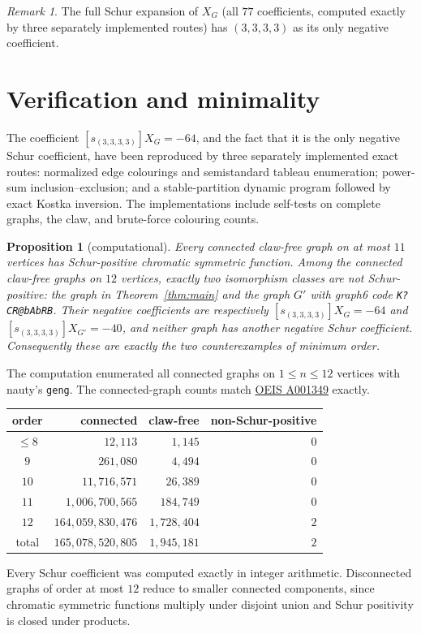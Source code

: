 \documentclass[11pt]{article}
\newtheorem{proposition}[theorem]{Proposition}
\theoremstyle{remark}
\newtheorem{remark}[theorem]{Remark}
\newcommand{\csf}{X}
\begin{document}
\begin{remark}
The full Schur expansion of $\csf_G$ (all $77$ coefficients, computed
exactly by three separately implemented routes) has $(3,3,3,3)$ as its only
negative coefficient.
\end{remark}

\section{Verification and minimality}

The coefficient $[s_{(3,3,3,3)}]\csf_G = -64$, and the fact that it is the
only negative Schur coefficient, have been reproduced by three separately
implemented exact routes: normalized edge colourings and semistandard
tableau enumeration; power-sum inclusion--exclusion; and a stable-partition
dynamic program followed by exact Kostka inversion. The implementations
include self-tests on complete graphs, the claw, and brute-force colouring
counts.

\begin{proposition}[computational]\label{prop:minimal}
Every connected claw-free graph on at most $11$ vertices has Schur-positive
chromatic symmetric function. Among the connected claw-free graphs on $12$
vertices, exactly two isomorphism classes are not Schur-positive: the graph
in Theorem~\ref{thm:main} and the graph $G'$ with graph6 code
\texttt{K?\textasciigrave CR@\textasciigrave bAbRB}. Their negative
coefficients are respectively
$[s_{(3,3,3,3)}]\csf_G=-64$ and
$[s_{(3,3,3,3)}]\csf_{G'}=-40$, and neither graph has another negative
Schur coefficient. Consequently these are exactly the two counterexamples
of minimum order.
\end{proposition}

The computation enumerated all connected graphs on $1 \le n \le 12$
vertices with \textsf{nauty}'s \texttt{geng}. The connected-graph counts
match \href{https://oeis.org/A001349}{OEIS A001349} exactly.
\begin{center}
\small
\begin{tabular}{c|r|r|r}
order & connected & claw-free & non-Schur-positive \\ \hline
$\leq 8$ & $12{,}113$ & $1{,}145$ & $0$ \\
$9$ & $261{,}080$ & $4{,}494$ & $0$ \\
$10$ & $11{,}716{,}571$ & $26{,}389$ & $0$ \\
$11$ & $1{,}006{,}700{,}565$ & $184{,}749$ & $0$ \\
$12$ & $164{,}059{,}830{,}476$ & $1{,}728{,}404$ & $2$ \\ \hline
total & $165{,}078{,}520{,}805$ & $1{,}945{,}181$ & $2$
\end{tabular}
\end{center}
Every Schur coefficient was computed exactly in integer arithmetic.
Disconnected graphs of order at most $12$ reduce to smaller connected
components, since chromatic symmetric functions multiply under disjoint
union and Schur positivity is closed under products.
\end{document}
